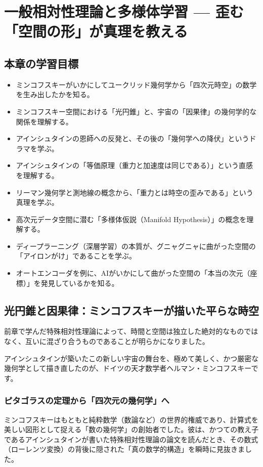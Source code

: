 \chapter{一般相対性理論と多様体学習 --- 歪む「空間の形」が真理を教える}

\section*{本章の学習目標}
\begin{itemize}
\item ミンコフスキーがいかにしてユークリッド幾何学から「四次元時空」の数学を生み出したかを知る。
\item ミンコフスキー空間における「光円錐」と、宇宙の「因果律」の幾何学的な関係を理解する。
\item アインシュタインの恩師への反発と、その後の「幾何学への降伏」というドラマを学ぶ。
\item アインシュタインの「等価原理（重力と加速度は同じである）」という直感を理解する。
\item リーマン幾何学と測地線の概念から、「重力とは時空の歪みである」という真理を学ぶ。
\item 高次元データ空間に潜む「多様体仮説（Manifold Hypothesis）」の概念を理解する。
\item ディープラーニング（深層学習）の本質が、グニャグニャに曲がった空間の「アイロンがけ」であることを学ぶ。
\item オートエンコーダを例に、AIがいかにして曲がった空間の「本当の次元（座標）」を発見しているかを知る。
\end{itemize}

\section{光円錐と因果律：ミンコフスキーが描いた平らな時空}

前章で学んだ特殊相対性理論によって、時間と空間は独立した絶対的なものではなく、互いに混ざり合うものであることが明らかになりました。

アインシュタインが築いたこの新しい宇宙の舞台を、極めて美しく、かつ厳密な幾何学として描き直したのが、ドイツの天才数学者ヘルマン・ミンコフスキーです。

\subsection{ピタゴラスの定理から「四次元の幾何学」へ}

ミンコフスキーはもともと純粋数学（数論など）の世界的権威であり、計算式を美しい図形として捉える「数の幾何学」の創始者でした。彼は、かつての教え子であるアインシュタインが書いた特殊相対性理論の論文を読んだとき、その数式（ローレンツ変換）の背後に隠された「真の数学的構造」を瞬時に見抜きました。

